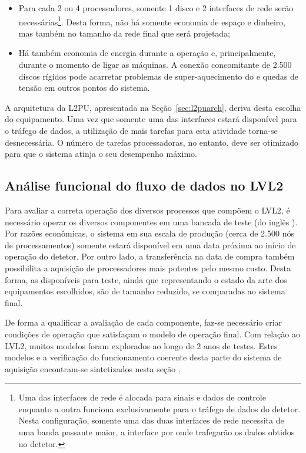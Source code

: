 \begin{itemize}
\item Para cada 2 ou 4 processadores, somente 1 disco e 2 interfaces de rede
serão necessárias\footnote{Uma das interfaces de rede é alocada para sinais e
dados de controle enquanto a outra funciona exclusivamente para o tráfego de
dados do detetor. Nesta configuração, somente uma das duas interfaces de rede
necessita de uma banda passante maior, a interface por onde trafegarão os
dados obtidos no detetor.}. Desta forma, não há somente economia de espaço e
dinheiro, mas também no tamanho da rede final que será projetada;

\item Há também economia de energia durante a operação e, principalmente,
durante o momento de ligar as máquinas. A conexão concomitante de 2.500 discos
rígidos pode acarretar problemas de super-aquecimento do  e
quedas de tensão em outros pontos do sistema.
\end{itemize}

A arquitetura da L2PU, apresentada na Seção~\ref{sec:l2puarch}, deriva desta
escolha do equipamento. Uma vez que somente uma das interfaces estará
disponível para o tráfego de dados, a utilização de mais tarefas para esta
atividade torna-se desnecessária. O número de tarefas processadoras, no
entanto, deve ser otimizado para que o sistema atinja o seu desempenho máximo.

\subsection{Análise funcional do fluxo de dados no LVL2}
\label{sec:lvl2work}

Para avaliar a correta operação dos diversos processos que compõem o LVL2, é
necessário operar os diversos componentes em uma bancada de teste (do inglês
). Por razões econômicas, o sistema em sua escala de produção
(cerca de 2.500 nós de processamentos) somente estará disponível em uma data
próxima ao início de operação do detetor. Por outro lado, a transferência na
data de compra também possibilita a aquisição de processadores mais potentes
pelo mesmo custo. Desta forma, as  disponíveis para teste, ainda
que representando o estado da arte dos equipamentos escolhidos, são de tamanho
reduzido, se comparadas ao sistema final.

De forma a qualificar a avaliação de cada componente, faz-se necessário criar
condições de operação que satisfaçam o modelo de operação final. Com relação
ao LVL2, muitos modelos foram explorados \cite{aa:tns-2004} ao longo de 2 anos
de testes. Estes modelos e a verificação do funcionamento coerente desta parte
do sistema de aquisição encontram-se sintetizados nesta seção \cite{hlt-tdr}.


